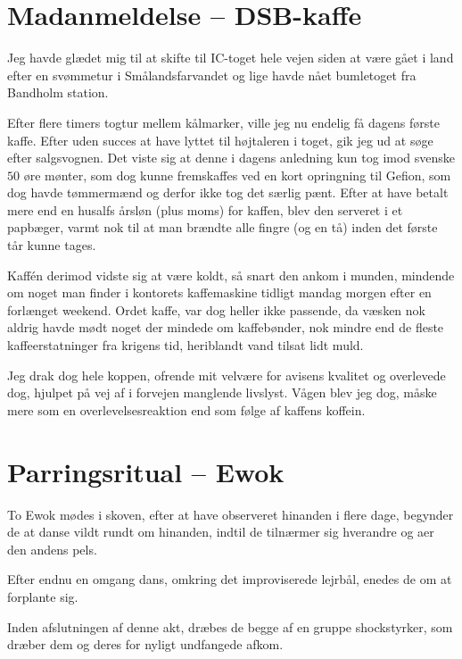 \begin{minipage}[t]{100mm}
\vspace{3mm}
\section*{Madanmeldelse -- DSB-kaffe}
\vspace{2mm}

Jeg havde glædet mig til at skifte til IC-toget hele vejen siden at være gået i land efter en svømmetur i Smålandsfarvandet og lige havde nået bumletoget fra Bandholm station.

Efter flere timers togtur mellem kålmarker, ville jeg nu endelig få dagens første kaffe. Efter uden succes at have lyttet til højtaleren i toget, gik jeg ud at søge efter salgsvognen. Det viste sig at denne i dagens anledning kun tog imod svenske $50$ øre mønter, som dog kunne fremskaffes ved en kort opringning til Gefion, som dog havde tømmermænd og derfor ikke tog det særlig pænt. Efter at have betalt mere end en husalfs årsløn (plus moms) for kaffen, blev den serveret i et papbæger, varmt nok til at man brændte alle fingre (og en tå) inden det første tår kunne tages. 

Kaffén derimod vidste sig at være koldt, så snart den ankom i munden, mindende om noget man finder i kontorets kaffemaskine tidligt mandag morgen efter en forlænget weekend. Ordet kaffe, var dog heller ikke passende, da væsken nok aldrig havde mødt noget der mindede om kaffebønder, nok mindre end de fleste kaffeerstatninger fra krigens tid, heriblandt vand tilsat lidt muld. 

Jeg drak dog hele koppen, ofrende mit velvære for avisens kvalitet og overlevede dog, hjulpet på vej af i forvejen manglende livslyst. Vågen blev jeg dog, måske mere som en overlevelsesreaktion end som følge af kaffens koffein.

\section*{Parringsritual -- Ewok}
To Ewok mødes i skoven, efter at have observeret hinanden i flere dage, begynder de at danse vildt rundt om hinanden, indtil de tilnærmer sig hverandre og aer den andens pels. 

Efter endnu en omgang dans, omkring det improviserede lejrbål, enedes de om at forplante sig. 

Inden afslutningen af denne akt, dræbes de begge af en gruppe shockstyrker, som dræber dem og deres for nyligt undfangede afkom.


\end{minipage}
